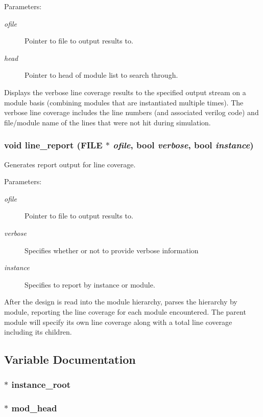 \begin{Desc}
\item[Parameters: ]\par
\begin{description}
\item[{\em 
ofile}]Pointer to file to output results to. \item[{\em 
head}]Pointer to head of module list to search through.\end{description}
\end{Desc}
Displays the verbose line coverage results to the specified output stream on a module basis (combining modules that are instantiated multiple times). The verbose line coverage includes the line numbers (and associated verilog code) and file/module name of the lines that were not hit during simulation. 
\subsubsection{\setlength{\rightskip}{0pt plus 5cm}void line\_\-report (FILE $\ast$ {\em ofile}, {\bf bool} {\em verbose}, {\bf bool} {\em instance})}\label{line_8c_a8}


Generates report output for line coverage.

\begin{Desc}
\item[Parameters: ]\par
\begin{description}
\item[{\em 
ofile}]Pointer to file to output results to. \item[{\em 
verbose}]Specifies whether or not to provide verbose information \item[{\em 
instance}]Specifies to report by instance or module.\end{description}
\end{Desc}
After the design is read into the module hierarchy, parses the hierarchy by module, reporting the line coverage for each module encountered. The parent module will specify its own line coverage along with a total line coverage including its  children. 

\subsection{Variable Documentation}
\subsubsection{$\ast$ instance\_\-root}\label{line_8c_a0}


\subsubsection{$\ast$ mod\_\-head}\label{line_8c_a1}


